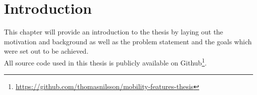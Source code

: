 \chapter{Introduction}
This chapter will provide an introduction to the thesis by laying out the motivation and background as well as the problem statement and the goals which were set out to be achieved.\\

All source code used in this thesis is publicly available on Github\footnote{\url{https://github.com/thomasnilsson/mobility-features-thesis}}.







